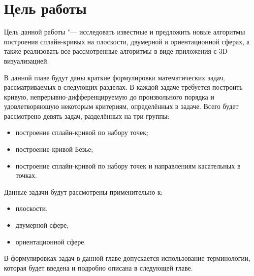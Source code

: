 \section{Цель работы}

Цель данной работы "--- исследовать известные и предложить новые алгоритмы построения сплайн-кривых на плоскости,
двумерной и ориентационной сферах, а также реализовать все рассмотренные алгоритмы в виде приложения с 3D-визуализацией.

В данной главе будут даны краткие формулировки математических задач, рассматриваемых в следующих разделах. В каждой
задаче требуется построить кривую, непрерывно-дифференцируемую до произвольного порядка и удовлетворяющую некоторым
критериям, определённых в задаче. Всего будет рассмотрено девять задач, разделённых на три группы:

\begin{itemize}

\item построение сплайн-кривой по набору точек;
\item построение кривой Безье;
\item построение сплайн-кривой по набору точек и направлениям касательных в точках.

\end{itemize}

Данные задачи будут рассмотрены применительно к:

\begin{itemize}

\item плоскости,
\item двумерной сфере,
\item ориентационной сфере.

\end{itemize}

В формулировках задач в данной главе допускается использование терминологии, которая будет введена и подробно описана
в следующей главе.

